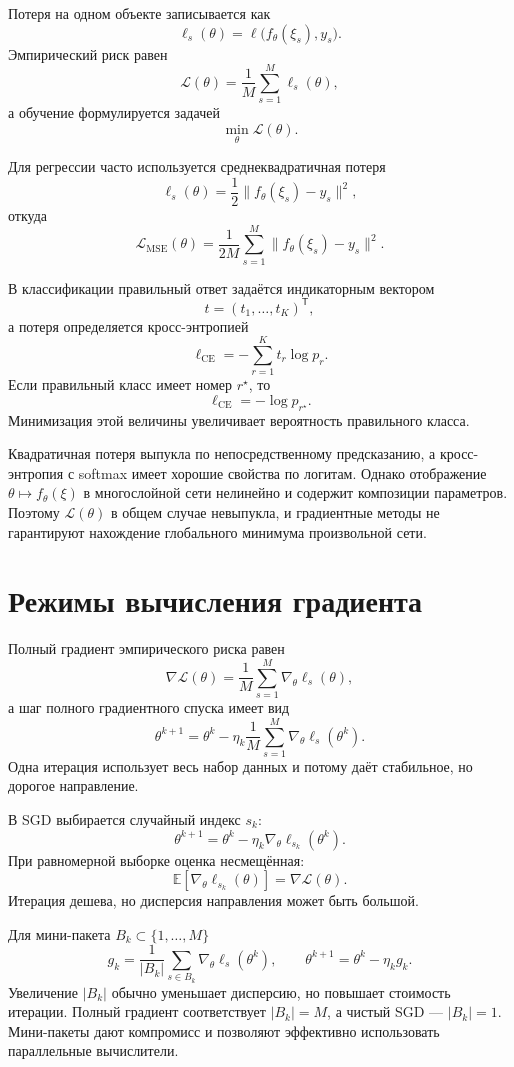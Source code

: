 Потеря на одном объекте записывается как
\[
    \ell_s(\theta)
    =
    \ell\bigl(f_\theta(\xi_s),y_s\bigr).
\]
Эмпирический риск равен
\[
    \mathcal L(\theta)
    =
    \frac1M\sum_{s=1}^{M}\ell_s(\theta),
\]
а обучение формулируется задачей
\[
    \min_\theta \mathcal L(\theta).
\]

Для регрессии часто используется среднеквадратичная потеря
\[
    \ell_s(\theta)
    =
    \frac12
    \lVert f_\theta(\xi_s)-y_s\rVert^2,
\]
откуда
\[
    \mathcal L_{\mathrm{MSE}}(\theta)
    =
    \frac1{2M}
    \sum_{s=1}^{M}
    \lVert f_\theta(\xi_s)-y_s\rVert^2.
\]

В классификации правильный ответ задаётся индикаторным вектором
\[
    t=(t_1,\ldots,t_K)^{\mathsf T},
\]
а потеря определяется кросс-энтропией
\[
    \ell_{\mathrm{CE}}
    =
    -\sum_{r=1}^{K}t_r\log p_r.
\]
Если правильный класс имеет номер \(r^\star\), то
\[
    \ell_{\mathrm{CE}}=-\log p_{r^\star}.
\]
Минимизация этой величины увеличивает вероятность правильного класса.

Квадратичная потеря выпукла по непосредственному предсказанию, а
кросс-энтропия с softmax имеет хорошие свойства по логитам. Однако
отображение \(\theta\mapsto f_\theta(\xi)\) в многослойной сети
нелинейно и содержит композиции параметров. Поэтому
\(\mathcal L(\theta)\) в общем случае невыпукла, и градиентные методы
не гарантируют нахождение глобального минимума произвольной сети.

\section{Режимы вычисления градиента}

Полный градиент эмпирического риска равен
\[
    \nabla\mathcal L(\theta)
    =
    \frac1M
    \sum_{s=1}^{M}\nabla_\theta\ell_s(\theta),
\]
а шаг полного градиентного спуска имеет вид
\[
    \theta^{k+1}
    =
    \theta^k
    -
    \eta_k
    \frac1M
    \sum_{s=1}^{M}
    \nabla_\theta\ell_s(\theta^k).
\]
Одна итерация использует весь набор данных и потому даёт стабильное,
но дорогое направление.

В SGD выбирается случайный индекс \(s_k\):
\[
    \theta^{k+1}
    =
    \theta^k
    -
    \eta_k\nabla_\theta\ell_{s_k}(\theta^k).
\]
При равномерной выборке оценка несмещённая:
\[
    \mathbb E
    \left[
        \nabla_\theta\ell_{s_k}(\theta)
    \right]
    =
    \nabla\mathcal L(\theta).
\]
Итерация дешева, но дисперсия направления может быть большой.

Для мини-пакета \(B_k\subset\{1,\ldots,M\}\)
\[
    g_k
    =
    \frac1{|B_k|}
    \sum_{s\in B_k}
    \nabla_\theta\ell_s(\theta^k),
    \qquad
    \theta^{k+1}=\theta^k-\eta_kg_k.
\]
Увеличение \(|B_k|\) обычно уменьшает дисперсию, но повышает стоимость
итерации. Полный градиент соответствует \(|B_k|=M\), а чистый SGD —
\(|B_k|=1\). Мини-пакеты дают компромисс и позволяют эффективно
использовать параллельные вычислители.

